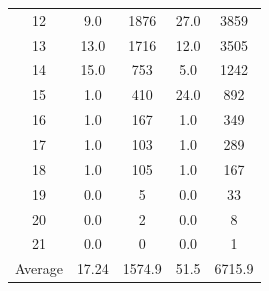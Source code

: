 \documentclass{article}
\begin{document}
\begin{table}[H]
\begin{tabular}{c c c c c}
        12      & 9.0                              & 1876                                & 27.0  & 3859   \\
        13      & 13.0                             & 1716                                & 12.0  & 3505   \\
        14      & 15.0                             & 753                                 & 5.0   & 1242   \\
        15      & 1.0                              & 410                                 & 24.0  & 892    \\
        16      & 1.0                              & 167                                 & 1.0   & 349    \\
        17      & 1.0                              & 103                                 & 1.0   & 289    \\
        18      & 1.0                              & 105                                 & 1.0   & 167    \\
        19      & 0.0                              & 5                                   & 0.0   & 33     \\
        20      & 0.0                              & 2                                   & 0.0   & 8      \\
        21      & 0.0                              & 0                                   & 0.0   & 1      \\
        \midrule
        Average & 17.24                            & 1574.9                              & 51.5  & 6715.9 \\
        \bottomrule
    \end{tabular}
\end{table}
\end{document}
